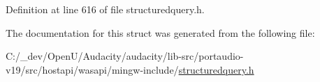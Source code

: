 Definition at line 616 of file structuredquery.\+h.



The documentation for this struct was generated from the following file\+:\begin{DoxyCompactItemize}
\item 
C\+:/\+\_\+dev/\+Open\+U/\+Audacity/audacity/lib-\/src/portaudio-\/v19/src/hostapi/wasapi/mingw-\/include/\hyperlink{structuredquery_8h}{structuredquery.\+h}\end{DoxyCompactItemize}
